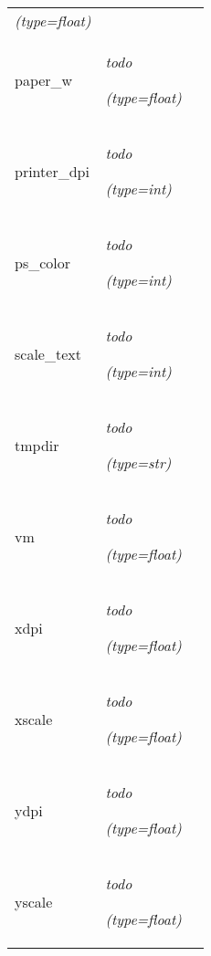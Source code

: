 \begin{longtable}{|p{\varnamewidth}|p{\vardescrwidth}|l}
            {\it (type=float)}&\\
\cline{1-2}
\raggedright p\-a\-p\-e\-r\-\_\-w\- & \raggedright \emph{todo}

            {\it (type=float)}&\\
\cline{1-2}
\raggedright p\-r\-i\-n\-t\-e\-r\-\_\-d\-p\-i\- & \raggedright \emph{todo}

            {\it (type=int)}&\\
\cline{1-2}
\raggedright p\-s\-\_\-c\-o\-l\-o\-r\- & \raggedright \emph{todo}

            {\it (type=int)}&\\
\cline{1-2}
\raggedright s\-c\-a\-l\-e\-\_\-t\-e\-x\-t\- & \raggedright \emph{todo}

            {\it (type=int)}&\\
\cline{1-2}
\raggedright t\-m\-p\-d\-i\-r\- & \raggedright \emph{todo}

            {\it (type=str)}&\\
\cline{1-2}
\raggedright v\-m\- & \raggedright \emph{todo}

            {\it (type=float)}&\\
\cline{1-2}
\raggedright x\-d\-p\-i\- & \raggedright \emph{todo}

            {\it (type=float)}&\\
\cline{1-2}
\raggedright x\-s\-c\-a\-l\-e\- & \raggedright \emph{todo}

            {\it (type=float)}&\\
\cline{1-2}
\raggedright y\-d\-p\-i\- & \raggedright \emph{todo}

            {\it (type=float)}&\\
\cline{1-2}
\raggedright y\-s\-c\-a\-l\-e\- & \raggedright \emph{todo}

            {\it (type=float)}&\\
\cline{1-2}
\end{longtable}



